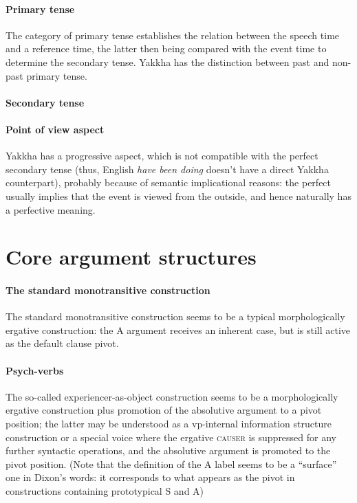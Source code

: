 \documentclass[a4paper, oneside, 12pt]{report}
\newcommand*{\citepage}[1]{p.~{#1}}
\newcommand{\form}[1]{\emph{#1}}
\newcommand*{\category}[1]{\textsc{#1}}
\begin{document}
\paragraph*{Primary tense}
The category of primary tense establishes the relation between the speech time and a reference time,
the latter then being compared with the event time to determine the secondary tense.
Yakkha has the distinction between past and non-past primary tense.

\paragraph*{Secondary tense}

\paragraph*{Point of view aspect}
Yakkha has a progressive aspect,
which is not compatible with the perfect secondary tense
(thus, English \form{have been doing} doesn't have a direct Yakkha counterpart),
probably because of semantic implicational reasons:
the perfect usually implies that the event is viewed from the outside,
and hence naturally has a perfective meaning.

\section{Core argument structures}

\paragraph*{The standard monotransitive construction}
The standard monotransitive construction seems to be 
a typical morphologically ergative construction:
the A argument receives an inherent case, 
but is still active as the default clause pivot.

\paragraph*{Psych-verbs}
The so-called experiencer-as-object construction \citep[\citepage{334}]{rapacha2008kiranti}
seems to be a morphologically ergative construction 
plus promotion of the absolutive argument to a pivot position; 
the latter may be understood as a \acs{vp}-internal information structure construction 
or a special voice where the ergative \category{causer} is suppressed 
for any further syntactic operations, 
and the absolutive argument is promoted to the pivot position.
(Note that the definition of the A label seems to be 
a ``surface'' one in Dixon's words: 
it corresponds to what appears as the pivot 
in constructions containing prototypical S and A)



\end{document}
